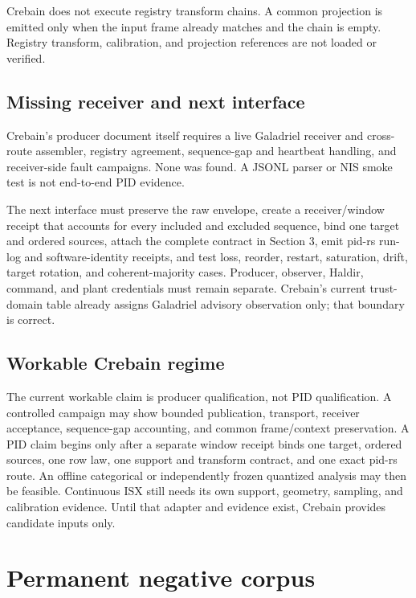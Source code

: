 \documentclass[11pt]{article}
\begin{document}
Crebain does not execute registry transform chains.  A common projection is
emitted only when the input frame already matches and the chain is empty.
Registry transform, calibration, and projection references are not loaded or
verified.

\subsection{Missing receiver and next interface}

Crebain's producer document itself requires a live Galadriel receiver and
cross-route assembler, registry agreement, sequence-gap and heartbeat handling,
and receiver-side fault campaigns.  None was found.  A JSONL parser or NIS smoke
test is not end-to-end PID evidence.

The next interface must preserve the raw envelope, create a receiver/window
receipt that accounts for every included and excluded sequence, bind one target
and ordered sources, attach the complete contract in Section 3, emit pid-rs
run-log and software-identity receipts, and test loss, reorder, restart,
saturation, drift, target rotation, and coherent-majority cases.  Producer,
observer, Haldir, command, and plant credentials must remain separate.  Crebain's
current trust-domain table already assigns Galadriel advisory observation only;
that boundary is correct.

\subsection{Workable Crebain regime}

The current workable claim is producer qualification, not PID qualification.  A
controlled campaign may show bounded publication, transport, receiver
acceptance, sequence-gap accounting, and common frame/context preservation.  A
PID claim begins only after a separate window receipt binds one target, ordered
sources, one row law, one support and transform contract, and one exact pid-rs
route.  An offline categorical or independently frozen quantized analysis may
then be feasible.  Continuous ISX still needs its own support, geometry,
sampling, and calibration evidence.  Until that adapter and evidence exist,
Crebain provides candidate inputs only.

\section{Permanent negative corpus}
\end{document}
